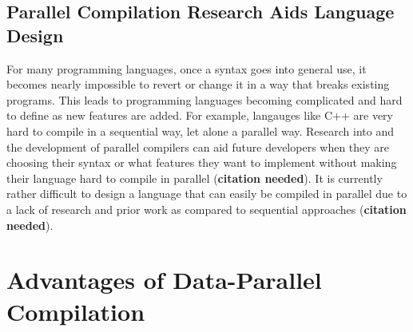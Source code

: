 \subsection{Parallel Compilation Research Aids Language Design}

For many programming languages, once a syntax goes into general use, it becomes
nearly impossible to revert or change it in a way that breaks existing programs.
This leads to programming languages becoming complicated and hard to define as
new features are added. For example, langauges like C++ are very hard to compile
in a sequential way, let alone a parallel way. Research into and the development
of parallel compilers can aid future developers when they are choosing their
syntax or what features they want to implement without making their language
hard to compile in parallel (\textbf{citation needed}). It is currently
rather difficult to design a language that can easily be compiled in parallel
due to a lack of research and prior work as compared to sequential approaches
(\textbf{citation needed}).

\section{Advantages of Data-Parallel Compilation}

